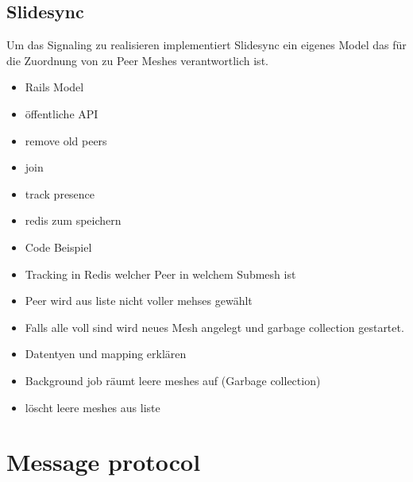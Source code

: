 \subsection{Slidesync}
Um das Signaling zu realisieren implementiert Slidesync ein eigenes Model das für die Zuordnung von \clients zu Peer Meshes verantwortlich ist.  
\begin{itemize}
	\item Rails Model
	\item öffentliche API
	\item remove old peers
	\item join
	\item track presence
	\item redis zum speichern
	\item Code Beispiel
	\item Tracking in Redis welcher Peer in welchem Submesh ist
	\item Peer wird aus liste nicht voller mehses gewählt
	\item Falls alle voll sind wird neues Mesh angelegt und garbage collection gestartet.
	\item Datentyen und mapping erklären
	\item Background job räumt leere meshes auf (Garbage collection)
	\item 	löscht leere meshes aus liste
\end{itemize}

\subsection{\schulCloud}

\section{Message protocol}

